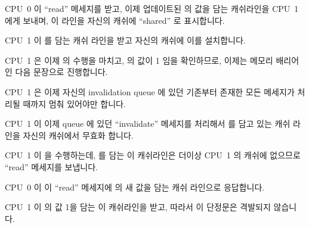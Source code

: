 \begin{fcvref}
\begin{sequence}
\fi

\item	CPU~0 이 ``read'' 메세지를 받고, 이제 업데이트된  의 값을 담는
	캐쉬라인을 CPU~1 에게 보내며, 이 라인을 자신의 캐쉬에 ``shared'' 로
	표시합니다.
\item	CPU~1 이  를 담는 캐쉬 라인을 받고 자신의 캐쉬에 이를
	설치합니다.
\item	CPU~1 은 이제  의 수행을 마치고,  의
	값이 1 임을 확인하므로, 이제는 메모리 배리어인 다음 문장으로
	진행합니다.
\item	CPU~1 은 이제 자신의 invalidation queue 에 있던 기존부터 존재한 모든
	메세지가 처리될 때까지 멈춰 있어야만 합니다.
\item	CPU~1 이 이제 queue 에 있던 ``invalidate'' 메세지를 처리해서  를
	담고 있는 캐쉬 라인을 자신의 캐쉬에서 무효화 합니다.
\item	CPU~1 이  을 수행하는데,  를 담는 이
	캐쉬라인은 더이상 CPU~1 의 캐쉬에 없으므로 ``read'' 메세지를 보냅니다.
\item	CPU~0 이 이 ``read'' 메세지에  의 새 값을 담는 캐쉬 라인으로
	응답합니다.
\item	CPU~1 이  의 값 1을 담는 이 캐쉬라인을 받고, 따라서 이 단정문은
	격발되지 않습니다.

\iffalse

\item	CPU~0 receives the ``read'' message, and transmits the
	cache line containing the now-updated value of \qco{b}
	to CPU~1, also marking the line as ``shared'' in its own cache.
\item	CPU~1 receives the cache line containing \qco{b} and installs
	it in its cache.
\item	CPU~1 can now finish executing \co{while (b == 0) continue},
	and since it finds that the value of \qco{b} is 1, it proceeds
	to the next statement, which is now a memory barrier.
\item	CPU~1 must now stall until it processes all pre-existing
	messages in its invalidation queue.
\item	CPU~1 now processes the queued
	``invalidate'' message, and
	invalidates the cache line containing \qco{a} from its own cache.
\item	CPU~1 executes the \co{assert(a == 1)}, and, since the
	cache line containing \qco{a} is no longer in CPU~1's cache,
	it transmits a ``read'' message.
\item	CPU~0 responds to this ``read'' message with the cache line
	containing the new value of \qco{a}.
\item	CPU~1 receives this cache line, which contains a value of 1 for
	\qco{a}, so that the assertion does not trigger.

\fi

\end{sequence}
\end{fcvref}

